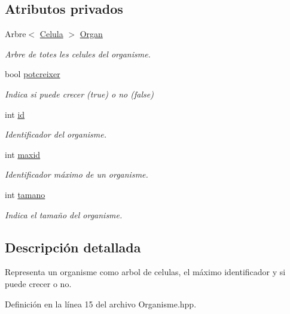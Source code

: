 \subsection*{Atributos privados}
\begin{DoxyCompactItemize}
\item 
Arbre$<$ \hyperlink{class_celula}{Celula} $>$ \hyperlink{class_organisme_a2b5474b1cfe7a6c6b2ffbab277382cef}{Organ}
\begin{DoxyCompactList}\small\item\em Arbre de totes les celules del organisme. \end{DoxyCompactList}\item 
bool \hyperlink{class_organisme_a7b2b434f51af578ace7b37993aedd4f9}{potcreixer}
\begin{DoxyCompactList}\small\item\em Indica si puede crecer (true) o no (false) \end{DoxyCompactList}\item 
int \hyperlink{class_organisme_ac2f0882eb2985d187f189fd238ceece3}{id}
\begin{DoxyCompactList}\small\item\em Identificador del organisme. \end{DoxyCompactList}\item 
int \hyperlink{class_organisme_a51070ec93d218a7c77af9817ca27fe8f}{maxid}
\begin{DoxyCompactList}\small\item\em Identificador máximo de un organisme. \end{DoxyCompactList}\item 
int \hyperlink{class_organisme_a03277939e7c5be36d0ee183ae6fa99c4}{tamano}
\begin{DoxyCompactList}\small\item\em Indica el tamaño del organisme. \end{DoxyCompactList}\end{DoxyCompactItemize}


\subsection{Descripción detallada}
Representa un organisme como arbol de celulas, el máximo identificador y si puede crecer o no. 

Definición en la línea 15 del archivo Organisme.\-hpp.



